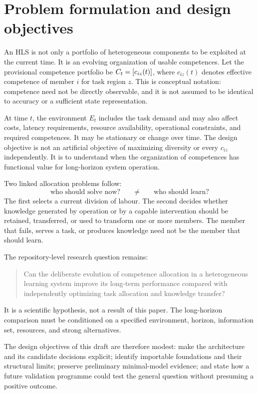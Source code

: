 \section{Problem formulation and design objectives}

An HLS is not only a portfolio of heterogeneous components to be exploited at the current time. It is an evolving organization of usable competences. Let the provisional competence portfolio be $C_t=[c_{iz}(t)]$, where $c_{iz}(t)$ denotes effective competence of member $i$ for task region $z$. This is conceptual notation: competence need not be directly observable, and it is not assumed to be identical to accuracy or a sufficient state representation.

At time $t$, the environment $E_t$ includes the task demand and may also affect costs, latency requirements, resource availability, operational constraints, and required competences. It may be stationary or change over time. The design objective is not an artificial objective of maximizing diversity or every $c_{iz}$ independently. It is to understand when the organization of competences has functional value for long-horizon system operation.

Two linked allocation problems follow:
\begin{equation}
\text{who should solve now?}\qquad \neq \qquad \text{who should learn?}
\label{eq:two-allocations}
\end{equation}
The first selects a current division of labour. The second decides whether knowledge generated by operation or by a capable intervention should be retained, transferred, or used to transform one or more members. The member that fails, serves a task, or produces knowledge need not be the member that should learn.

The repository-level research question remains:
\begin{quote}
Can the deliberate evolution of competence allocation in a heterogeneous learning system improve its long-term performance compared with independently optimizing task allocation and knowledge transfer?
\end{quote}
It is a scientific hypothesis, not a result of this paper. The long-horizon comparison must be conditioned on a specified environment, horizon, information set, resources, and strong alternatives.

The design objectives of this draft are therefore modest: make the architecture and its candidate decisions explicit; identify importable foundations and their structural limits; preserve preliminary minimal-model evidence; and state how a future validation programme could test the general question without presuming a positive outcome.
